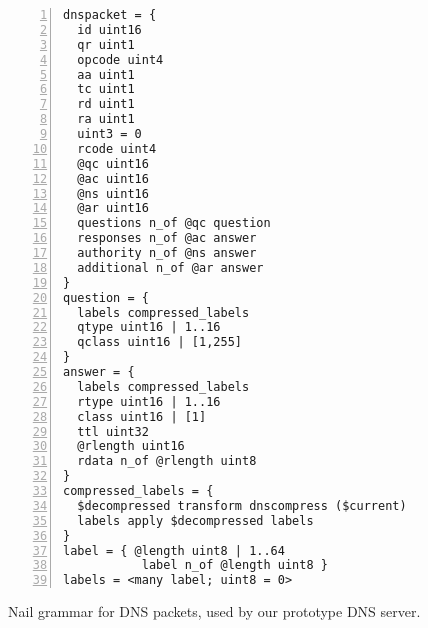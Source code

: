 \begin{figure}
\smaller[0.5]
\begin{Verbatim}[numbers=left]
dnspacket = {
  id uint16
  qr uint1
  opcode uint4
  aa uint1
  tc uint1
  rd uint1
  ra uint1
  uint3 = 0
  rcode uint4
  @qc uint16
  @ac uint16
  @ns uint16
  @ar uint16
  questions n_of @qc question
  responses n_of @ac answer
  authority n_of @ns answer
  additional n_of @ar answer
}
question = {
  labels compressed_labels
  qtype uint16 | 1..16
  qclass uint16 | [1,255]
}
answer = {
  labels compressed_labels
  rtype uint16 | 1..16
  class uint16 | [1]
  ttl uint32
  @rlength uint16
  rdata n_of @rlength uint8
}
compressed_labels = {
  $decompressed transform dnscompress ($current)
  labels apply $decompressed labels
}
label = { @length uint8 | 1..64
           label n_of @length uint8 }
labels = <many label; uint8 = 0>
\end{Verbatim}
\caption{Nail grammar for DNS packets, used by our prototype DNS server.}
\label{fig:dns-full}
\end{figure}
